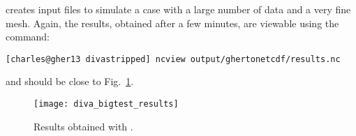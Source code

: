  creates input files to simulate a case with a large number of data and a very fine mesh. Again, the results, obtained after a few minutes, are viewable using the command:
\begin{lstlisting}[style=Bash]
[charles@gher13 divastripped] ncview output/ghertonetcdf/results.nc
\end{lstlisting}
and should be close to Fig.~\ref{fig:diva_bigtest_results}.

\begin{figure}[H]
\centering 
\texttt{[image: diva\_bigtest\_results]}
\caption{Results obtained with .\label{fig:diva_bigtest_results}}
\end{figure}



%
%
%
%
%
%
%
%
%
%
%
%

